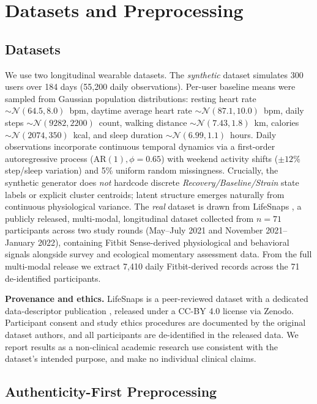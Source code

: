 \documentclass[conference]{IEEEtran}
\begin{document}
\section{Datasets and Preprocessing}

\subsection{Datasets}

We use two longitudinal wearable datasets. The \emph{synthetic} dataset simulates 300 users over 184 days (55{,}200 daily observations). Per-user baseline means were sampled from Gaussian population distributions: resting heart rate $\sim\mathcal{N}(64.5, 8.0)$~bpm, daytime average heart rate $\sim\mathcal{N}(87.1, 10.0)$~bpm, daily steps $\sim\mathcal{N}(9282, 2200)$~count, walking distance $\sim\mathcal{N}(7.43, 1.8)$~km, calories $\sim\mathcal{N}(2074, 350)$~kcal, and sleep duration $\sim\mathcal{N}(6.99, 1.1)$~hours. Daily observations incorporate continuous temporal dynamics via a first-order autoregressive process ($\text{AR}(1), \phi=0.65$) with weekend activity shifts ($\pm 12\%$ step/sleep variation) and 5\% uniform random missingness. Crucially, the synthetic generator does \emph{not} hardcode discrete \textit{Recovery/Baseline/Strain} state labels or explicit cluster centroids; latent structure emerges naturally from continuous physiological variance. The \emph{real} dataset is drawn from LifeSnaps \cite{b15}, a publicly released, multi-modal, longitudinal dataset collected from $n=71$ participants across two study rounds (May--July 2021 and November 2021--January 2022), containing Fitbit Sense-derived physiological and behavioral signals alongside survey and ecological momentary assessment data. From the full multi-modal release we extract 7{,}410 daily Fitbit-derived records across the 71 de-identified participants.

\textbf{Provenance and ethics.} LifeSnaps is a peer-reviewed dataset with a dedicated data-descriptor publication \cite{b15}, released under a CC-BY 4.0 license via Zenodo. Participant consent and study ethics procedures are documented by the original dataset authors, and all participants are de-identified in the released data. We report results as a non-clinical academic research use consistent with the dataset's intended purpose, and make no individual clinical claims.

\subsection{Authenticity-First Preprocessing}
\end{document}
